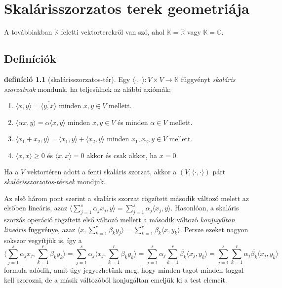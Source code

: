 \documentclass[a4paper, showtrims]{memoir}
\theoremstyle{plain}
\theoremstyle{remark}
\theoremstyle{definition}
\newtheorem{definition}[proposition]{definíció}
\newcommand{\ip}[2]{\langle#1,#2\rangle}
\begin{document}
\chapter{Skalárisszorzatos terek geometriája}
A továbbiakban $\mathbb{K}$ feletti vektorterekről van szó,
ahol $\mathbb{K}=\mathbb{R}$ vagy $\mathbb{K}=\mathbb{C}$.
\section{Definíciók}

\begin{definition}[skalárisszorzatos-tér]
	Egy $\ip{\cdot}{\cdot}:V\times V\to \mathbb{K}$ függvényt \emph{skaláris szorzatnak} mondunk, ha
	teljesülnek az alábbi axiómák:
	\begin{enumerate}
		\item $\ip{x}{y}=\overline{\ip{y}{x}}$ minden $x,y\in V$ mellett.
		\item
		      $\ip{\alpha x}{y}=
			      \alpha\ip{x}{y}$ minden $x,y\in V$ és minden $\alpha\in V$ mellett.
		\item
		      $\ip{x_1+x_2}{y}=
			      \ip{x_1}{y}+\ip{x_2}{y}$ minden $x_1,x_2,y\in V$ mellett.
		\item
		      $\ip{x}{x}\geq 0$ és $\ip{x}{x}=0$ akkor és csak akkor, ha $x=0$.
	\end{enumerate}
	Ha a $V$ vektortéren adott a fenti skaláris szorzat,
	akkor a $\left( V,\ip{\cdot}{\cdot} \right)$ párt \emph{skalárisszorzatos-térnek} mondjuk.
\end{definition}
Az első három pont szerint a skaláris szorzat rögzített második változó melett az elsőben lineáris, azaz
$
	\ip{\sum_{j=1}^s\alpha_jx_j}{y}
	=
	\sum_{j=1}^s\alpha_j\ip{x_j}{y}$.
Hasonlóan, a skaláris szorzás operáció rögzített első változó mellett a második változó
\emph{konjugáltan lineáris} függvénye,
azaz
\begin{math}
	\ip{x}{\sum_{k=1}^r\beta_ky_j}
	=
	\sum_{k=1}^r\overline{\beta_k}\ip{x}{y_k}.
\end{math}
Persze ezeket nagyon sokszor vegyítjük is,
így a
\[
	\ip{\sum_{j=1}^s\alpha_jx_j}{\sum_{k=1}^r\beta_ky_k}
	=
	\sum_{j=1}^s\alpha_j\ip{x_j}{\sum_{k=1}^r\beta_ky_k}
	=
	\sum_{j=1}^s\alpha_j\sum_{k=1}^r\overline{\beta_k}\ip{x_j}{y_k}
	=
	\sum_{j=1}^s\sum_{k=1}^r\alpha_j\overline{\beta_k}\ip{x_j}{y_k}
\]
formula adódik, amit úgy jegyezhetünk meg, hogy minden tagot minden taggal kell szorozni,
de a másik változóból konjugáltan emeljük ki a test elemeit.
\end{document}
